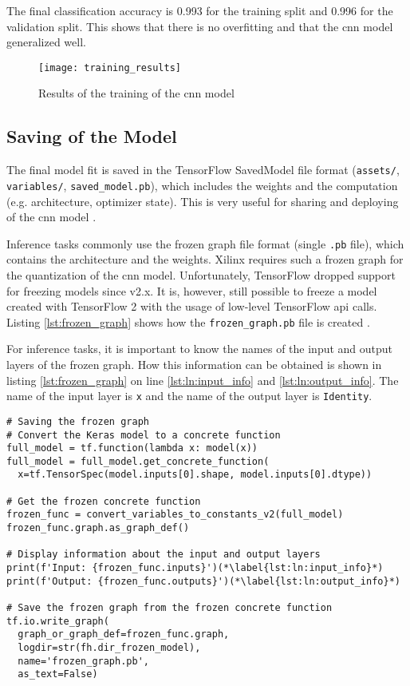 The final classification accuracy is \num{0.993} for the training split and \num{0.996} for the validation split.
This shows that there is no overfitting and that the \acrshort{cnn} model generalized well.

\begin{figure}
  \centering
  \texttt{[image: training\_results]}
  \caption{Results of the training of the \acrshort{cnn} model}
  \label{fig:training_results}
\end{figure}

\subsection{Saving of the Model}
\label{subsec:training_of_the_cnn:training:saving_of_the_model}
The final model fit is saved in the TensorFlow SavedModel file format (\texttt{assets/}, \texttt{variables/}, \texttt{saved\_model.pb}), which includes the weights and the computation (e.g. architecture, optimizer state).
This is very useful for sharing and deploying of the \acrshort{cnn} model \cite{training_train_tf_keras_saving_loading}.

Inference tasks commonly use the frozen graph file format (single \texttt{.pb} file), which contains the architecture and the weights.
Xilinx requires such a frozen graph for the quantization of the \acrshort{cnn} model.
Unfortunately, TensorFlow dropped support for freezing models since v2.x.
It is, however, still possible to freeze a model created with TensorFlow 2 with the usage of low-level TensorFlow \acrshort{api} calls.
Listing \ref{lst:frozen_graph} shows how the \texttt{frozen\_graph.pb} file is created \cite{training_train_frozen}.

For inference tasks, it is important to know the names of the input and output layers of the frozen graph.
How this information can be obtained is shown in listing \ref{lst:frozen_graph} on line \ref{lst:ln:input_info} and \ref{lst:ln:output_info}.
The name of the input layer is \texttt{x} and the name of the output layer is \texttt{Identity}.

\clearpage

\begin{lstlisting}[style=python, caption={Saving the model in the frozen graph file format \cite{training_train_frozen}}, label=lst:frozen_graph]
# Saving the frozen graph
# Convert the Keras model to a concrete function
full_model = tf.function(lambda x: model(x))
full_model = full_model.get_concrete_function(
  x=tf.TensorSpec(model.inputs[0].shape, model.inputs[0].dtype))

# Get the frozen concrete function
frozen_func = convert_variables_to_constants_v2(full_model)
frozen_func.graph.as_graph_def()

# Display information about the input and output layers
print(f'Input: {frozen_func.inputs}')(*\label{lst:ln:input_info}*)
print(f'Output: {frozen_func.outputs}')(*\label{lst:ln:output_info}*)

# Save the frozen graph from the frozen concrete function
tf.io.write_graph(
  graph_or_graph_def=frozen_func.graph,
  logdir=str(fh.dir_frozen_model),
  name='frozen_graph.pb',
  as_text=False)
\end{lstlisting}

